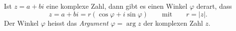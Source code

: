 \begin{definition}
%
Ist $z=a+bi$ eine komplexe Zahl, dann gibt es einen Winkel $\varphi$ derart,
dass 
\[
z
=
a + bi
=
r(\cos\varphi + i\sin\varphi)
\qquad\text{mit}\qquad
r=|z|.
\]
Der Winkel $\varphi$ heisst das \emph{Argument} $\varphi=\operatorname{arg}z$
der komplexen Zahl $z$.
%
%
\end{definition}

